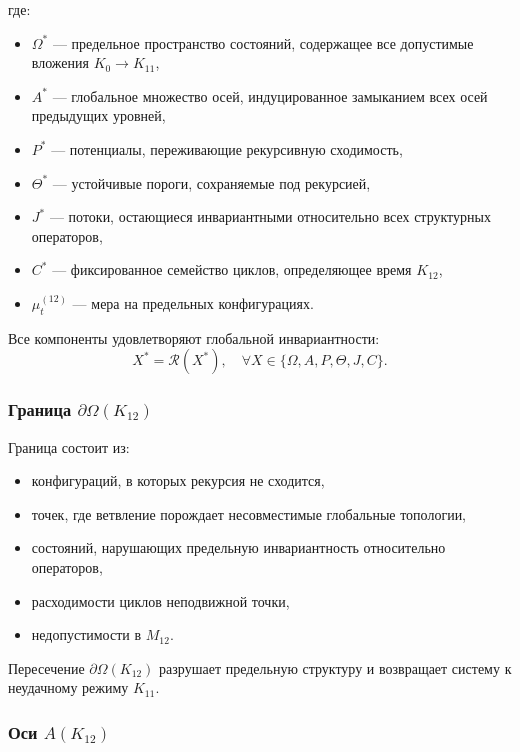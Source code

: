 где:
\begin{itemize}
    \item $\Omega^*$ — предельное пространство состояний, содержащее все
          допустимые вложения $K_0\!\to\!K_{11}$,
    \item $A^*$ — глобальное множество осей, индуцированное замыканием всех
          осей предыдущих уровней,
    \item $P^*$ — потенциалы, переживающие рекурсивную сходимость,
    \item $\Theta^*$ — устойчивые пороги, сохраняемые под рекурсией,
    \item $J^*$ — потоки, остающиеся инвариантными относительно всех
          структурных операторов,
    \item $C^*$ — фиксированное семейство циклов, определяющее время $K_{12}$,
    \item $\mu^{(12)}_t$ — мера на предельных конфигурациях.
\end{itemize}

Все компоненты удовлетворяют глобальной инвариантности:
\[
X^* = \mathcal{R}(X^*),\quad \forall X \in \{\Omega, A, P, \Theta, J, C\}.
\]

\subsubsection{Граница $\partial\Omega(K_{12})$}

Граница состоит из:
\begin{itemize}
    \item конфигураций, в которых рекурсия не сходится,
    \item точек, где ветвление порождает несовместимые глобальные топологии,
    \item состояний, нарушающих предельную инвариантность относительно
          операторов,
    \item расходимости циклов неподвижной точки,
    \item недопустимости в $M_{12}$.
\end{itemize}

Пересечение $\partial\Omega(K_{12})$ разрушает предельную структуру и
возвращает систему к неудачному режиму $K_{11}$.

\subsubsection{Оси $A(K_{12})$}

